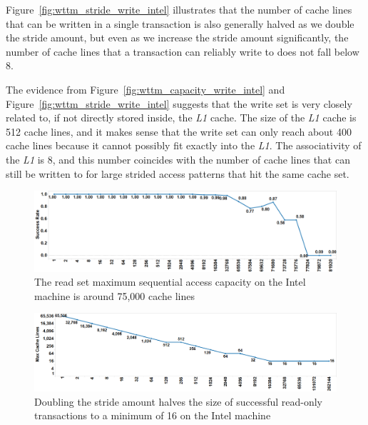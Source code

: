 \documentclass{article}
\begin{document}
Figure~\ref{fig:wttm_stride_write_intel} illustrates that the number of cache
lines that can be written in a single transaction is also generally halved as we
double the stride amount, but even as we increase the stride amount
significantly, the number of cache lines that a transaction can reliably write
to does not fall below 8.

The evidence from Figure~\ref{fig:wttm_capacity_write_intel} and
Figure~\ref{fig:wttm_stride_write_intel} suggests that the write set is very
closely related to, if not directly stored inside, the \textit{L1} cache. The
size of the \textit{L1} cache is 512 cache lines, and it makes sense that the
write set can only reach about 400 cache lines because it cannot possibly fit
exactly into the \textit{L1}. The associativity of the \textit{L1} is 8, and
this number coincides with the number of cache lines that can still be written
to for large strided access patterns that hit the same cache set.

\begin{figure}[]%
\centering
{}
\includegraphics[width=\linewidth]{images/wttm_capacity_read_intel}
\caption{The read set maximum sequential access capacity on the Intel machine is
around 75,000 cache lines}
\label{fig:wttm_capacity_read_intel}
\end{figure}

\begin{figure}[]%
\centering
{}
\includegraphics[width=\linewidth]{images/wttm_stride_read_intel}
\caption{Doubling the stride amount halves the size of successful read-only
transactions to a minimum of 16 on the Intel machine}
\label{fig:wttm_stride_read_intel}
\end{figure}
\end{document}
